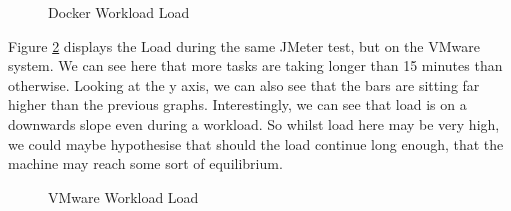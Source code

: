 \begin{figure}[H]
\caption{Docker Workload Load}
\label{fig:Dockerloadwork}
\centering
\end{figure}

Figure \ref{fig:VMwareloadwork} displays the Load during the same JMeter test, but on the VMware system. We can see here that more tasks are taking longer than 15 minutes than otherwise. Looking at the y axis, we can also see that the bars are sitting far higher than the previous graphs. Interestingly, we can see that load is on a downwards slope even during a workload. So whilst load here may be very high, we could maybe hypothesise that should the load continue long enough, that the machine may reach some sort of equilibrium.

\begin{figure}[H]
\caption{VMware Workload Load}
\label{fig:VMwareloadwork}
\centering
\end{figure}
